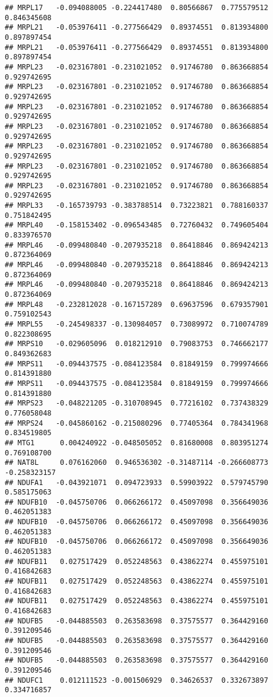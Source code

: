\documentclass[
]{article}
\begin{document}
\begin{verbatim}
## MRPL17   -0.094088005 -0.224417480  0.80566867  0.775579512  0.846345608
## MRPL21   -0.053976411 -0.277566429  0.89374551  0.813934800  0.897897454
## MRPL21   -0.053976411 -0.277566429  0.89374551  0.813934800  0.897897454
## MRPL23   -0.023167801 -0.231021052  0.91746780  0.863668854  0.929742695
## MRPL23   -0.023167801 -0.231021052  0.91746780  0.863668854  0.929742695
## MRPL23   -0.023167801 -0.231021052  0.91746780  0.863668854  0.929742695
## MRPL23   -0.023167801 -0.231021052  0.91746780  0.863668854  0.929742695
## MRPL23   -0.023167801 -0.231021052  0.91746780  0.863668854  0.929742695
## MRPL23   -0.023167801 -0.231021052  0.91746780  0.863668854  0.929742695
## MRPL23   -0.023167801 -0.231021052  0.91746780  0.863668854  0.929742695
## MRPL33   -0.165739793 -0.383788514  0.73223821  0.788160337  0.751842495
## MRPL40   -0.158153402 -0.096543485  0.72760432  0.749605404  0.833976570
## MRPL46   -0.099480840 -0.207935218  0.86418846  0.869424213  0.872364069
## MRPL46   -0.099480840 -0.207935218  0.86418846  0.869424213  0.872364069
## MRPL46   -0.099480840 -0.207935218  0.86418846  0.869424213  0.872364069
## MRPL48   -0.232812028 -0.167157289  0.69637596  0.679357901  0.759102543
## MRPL55   -0.245498337 -0.130984057  0.73089972  0.710074789  0.822308695
## MRPS10   -0.029605096  0.018212910  0.79083753  0.746662177  0.849362683
## MRPS11   -0.094437575 -0.084123584  0.81849159  0.799974666  0.814391880
## MRPS11   -0.094437575 -0.084123584  0.81849159  0.799974666  0.814391880
## MRPS23   -0.048221205 -0.310708945  0.77216102  0.737438329  0.776058048
## MRPS24   -0.045860162 -0.215080296  0.77405364  0.784341968  0.834519805
## MTG1      0.004240922 -0.048505052  0.81680008  0.803951274  0.769108700
## NAT8L     0.076162060  0.946536302 -0.31487114 -0.266608773 -0.258323157
## NDUFA1   -0.043921071  0.094723933  0.59903922  0.579745790  0.585175063
## NDUFB10  -0.045750706  0.066266172  0.45097098  0.356649036  0.462051383
## NDUFB10  -0.045750706  0.066266172  0.45097098  0.356649036  0.462051383
## NDUFB10  -0.045750706  0.066266172  0.45097098  0.356649036  0.462051383
## NDUFB11   0.027517429  0.052248563  0.43862274  0.455975101  0.416842683
## NDUFB11   0.027517429  0.052248563  0.43862274  0.455975101  0.416842683
## NDUFB11   0.027517429  0.052248563  0.43862274  0.455975101  0.416842683
## NDUFB5   -0.044885503  0.263583698  0.37575577  0.364429160  0.391209546
## NDUFB5   -0.044885503  0.263583698  0.37575577  0.364429160  0.391209546
## NDUFB5   -0.044885503  0.263583698  0.37575577  0.364429160  0.391209546
## NDUFC1    0.012111523 -0.001506929  0.34626537  0.332673897  0.334716857

\end{verbatim}
\end{document}
